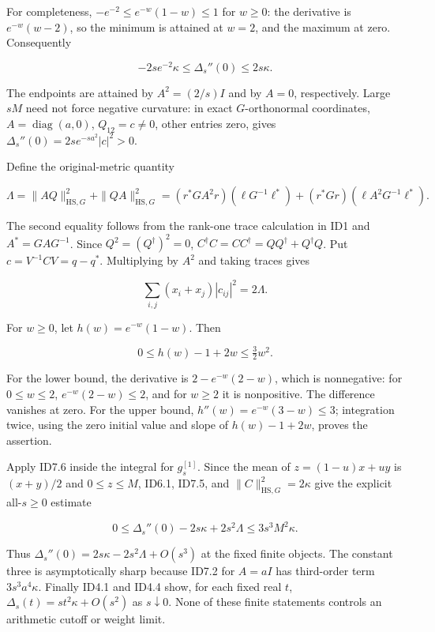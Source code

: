 \documentclass[11pt]{article}
\begin{document}
For completeness, \(-e^{-2}\le e^{-w}(1-w)\le1\) for \(w\ge0\): the derivative is \(e^{-w}(w-2)\), so the minimum is attained at \(w=2\), and the maximum at zero. Consequently

\[
-2s e^{-2}\kappa\le\Delta_s''(0)\le2s\kappa. \tag{ID7.3}
\]

The endpoints are attained by \(A^2=(2/s)I\) and by \(A=0\), respectively. Large \(sM\) need not force negative curvature: in exact \(G\)-orthonormal coordinates, \(A=\operatorname{diag}(a,0)\), \(Q_{12}=c\ne0\), other entries zero, gives \(\Delta_s''(0)=2s e^{-sa^2}|c|^2>0\).

Define the original-metric quantity

\[
\Lambda=\|AQ\|_{\mathrm{HS},G}^2+\|QA\|_{\mathrm{HS},G}^2
=(r^*GA^2r)(\ell G^{-1}\ell^*)
+(r^*Gr)(\ell A^2G^{-1}\ell^*). \tag{ID7.4}
\]

The second equality follows from the rank-one trace calculation in ID1 and \(A^*=GAG^{-1}\). Since \(Q^2=(Q^\dagger)^2=0\), \(C^\dagger C=CC^\dagger=QQ^\dagger+Q^\dagger Q\). Put \(c=V^{-1}CV=q-q^*\). Multiplying by \(A^2\) and taking traces gives

\[
\sum_{i,j}(x_i+x_j)|c_{ij}|^2=2\Lambda. \tag{ID7.5}
\]

For \(w\ge0\), let \(h(w)=e^{-w}(1-w)\). Then

\[
0\le h(w)-1+2w\le\tfrac32w^2. \tag{ID7.6}
\]

For the lower bound, the derivative is \(2-e^{-w}(2-w)\), which is nonnegative: for \(0\le w\le2\), \(e^{-w}(2-w)\le2\), and for \(w\ge2\) it is nonpositive. The difference vanishes at zero. For the upper bound, \(h''(w)=e^{-w}(3-w)\le3\); integration twice, using the zero initial value and slope of \(h(w)-1+2w\), proves the assertion.

Apply ID7.6 inside the integral for \(g_s^{[1]}\). Since the mean of \(z=(1-u)x+uy\) is \((x+y)/2\) and \(0\le z\le M\), ID6.1, ID7.5, and \(\|C\|_{\mathrm{HS},G}^2=2\kappa\) give the explicit all-\(s\ge0\) estimate

\[
\boxed{0\le\Delta_s''(0)-2s\kappa+2s^2\Lambda
\le3s^3M^2\kappa.} \tag{ID7.7}
\]

Thus \(\Delta_s''(0)=2s\kappa-2s^2\Lambda+O(s^3)\) at the fixed finite objects. The constant three is asymptotically sharp because ID7.2 for \(A=aI\) has third-order term \(3s^3a^4\kappa\). Finally ID4.1 and ID4.4 show, for each fixed real \(t\), \(\Delta_s(t)=st^2\kappa+O(s^2)\) as \(s\downarrow0\). None of these finite statements controls an arithmetic cutoff or weight limit.
\end{document}
